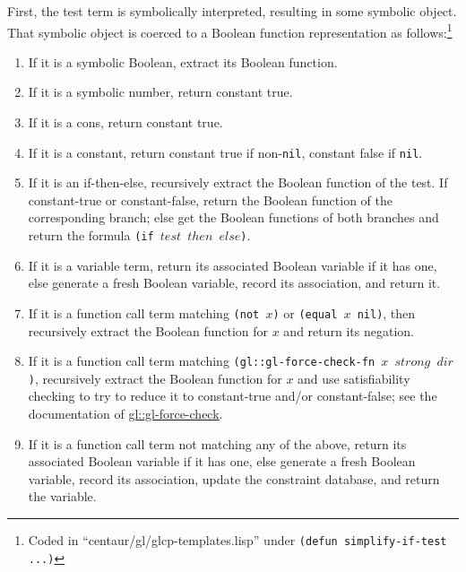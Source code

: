 \documentclass[submission,copyright,creativecommons]{eptcs}
\newcommand*{\var}[1]{\mathit{#1}}
\begin{document}
First, the test term is symbolically interpreted, resulting in some
symbolic object.  That symbolic object is coerced to a Boolean
function representation as follows:\footnote{Coded in
  ``centaur/gl/glcp-templates.lisp'' under \texttt{(defun
    simplify-if-test ...)}}
\begin{enumerate}
\item If it is a symbolic Boolean, extract its Boolean function.
\item If it is a symbolic number, return constant true.
\item If it is a cons, return constant true.
\item If it is a constant, return constant true if non-\texttt{nil}, constant false if \texttt{nil}.
\item If it is an if-then-else, recursively extract the Boolean
  function of the test.  If constant-true or constant-false, return
  the Boolean function of the corresponding branch; else get the
  Boolean functions of both branches and return the
  formula \texttt{(if $\var{test}$ $\var{then}$ $\var{else}$)}.
\item If it is a variable term, return its associated Boolean variable
  if it has one, else generate a fresh Boolean variable, record its
  association, and return it.
\item If it is a function call term matching \texttt{(not $x$)} or
  \texttt{(equal $x$ nil)}, then recursively extract the Boolean
  function for $x$ and return its negation.
\item If it is a function call term matching
  \texttt{(gl::gl-force-check-fn $x$ $\var{strong}$ $\var{dir}$)},
  recursively extract the Boolean function for $x$ and use
  satisfiability checking to try to reduce it to constant-true and/or
  constant-false; see the documentation of
  \href{http://www.cs.utexas.edu/users/moore/acl2/manuals/current/manual/?topic=GL____GL-FORCE-CHECK}{\underline{gl::gl-force-check}}.
\item If it is a function call term not matching any of the above,
  return its associated Boolean variable if it has one, else generate
  a fresh Boolean variable, record its association, update the
  constraint database, and return the variable.
\end{enumerate}
\end{document}
